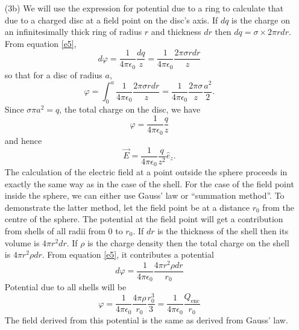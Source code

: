 \documentclass{article}
\newcommand{\uv}[1]{\hat{e}_{#1}}
\newcommand{\ke}{\frac{1}{4\pi\epsilon_0}}
\begin{document}
\begin{enumerate}
\item[(3b)] We will use the expression for potential due to a ring to calculate 
that due to a charged disc at a field point on the disc's axis. If $dq$ is the 
charge on an infinitesimally thick ring of radius $r$ and thickness $dr$ then 
$dq = \sigma \times 2\pi rdr$. From equation \eqref{e5},
\[
d\varphi = \ke\frac{dq}{z} = \ke\frac{2\pi\sigma rdr}{z}
\]
so that for a disc of radius $a$,
\[
\varphi = \int_0^a \ke\frac{2\pi\sigma rdr}{z} = \ke\frac{2\pi\sigma}{z}\frac{a^2}{2}.
\]
Since $\sigma\pi a^2 = q$, the total charge on the disc, we have
\begin{equation}\label{e7}
\varphi = \ke\frac{q}{z}
\end{equation}
and hence 
\begin{equation}\label{e8}
\vec{E} = \ke \frac{q}{z^2}\uv{z}.
\end{equation}
The calculation of the electric field at a point outside the sphere proceeds in
exactly the same way as in the case of the shell. For the case of the field point 
inside the sphere, we can either use Gauss' law or ``summation method''. To
demonstrate the latter method, let the field point be at a distance $r_0$ from the
centre of the sphere. The potential at the field point will get a contribution
from shells of all radii from $0$ to $r_0$. If $dr$ is the thickness of the shell
then its volume is $4\pi r^2dr$. If $\rho$ is the charge density then the total
charge on the shell is $4\pi r^2\rho dr$. From equation \eqref{e5}, it contributes
a potential
\[
d\varphi = \ke \frac{4\pi r^2\rho dr}{r_0}
\]
Potential due to all shells will be
\[
\varphi = \ke\frac{4\pi\rho}{r_0}\frac{r_0^3}{3} = \ke\frac{Q_{\text{enc}}}{r_0}
\]
The field derived from this potential is the same as derived from Gauss' law.
\end{enumerate}
\end{document}
